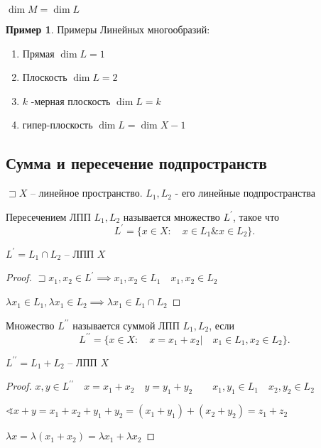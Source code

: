 \documentclass{book}
\newcommand{\p}[1]{#1^{\prime}}
\newcommand{\pp}[1]{#1^{\prime\prime}}
\theoremstyle{definition}
\newtheorem*{example}{Пример}
\begin{document}
\begin{definition}
    $\dim M = \dim L$
\end{definition}

\begin{example}
    Примеры Линейных многообразий:
    \begin{enumerate}
        \item Прямая $\dim L=1$
        \item Плоскость  $\dim L = 2$
        \item  $k$ -мерная плоскость  $\dim L=k$
        \item гипер-плоскость  $\dim L = \dim X-1$
    \end{enumerate}
\end{example}

\subsection{Сумма и пересечение подпространств}

$\sqsupset X$ -- линейное пространство. $L_1, L_2$ - его линейные подпространства

\begin{definition}
    Пересечением ЛПП $L_1, L_2$ называется множество $\p L$, такое что  \[
        \p L = \{x\in X:\quad x\in L_1 \& x\in L_2\}
    .\] 
\end{definition}

\begin{lemma}
    $\p L = L_1\cap L_2$ -- ЛПП $X$
\end{lemma}
\begin{proof}
    $\sqsupset x_1, x_2\in \p L \implies x_1, x_2\in L_1\quad x_1, x_2\in L_2$

    $\lambda x_1\in L_1, \lambda x_1\in L_2 \implies \lambda x_1\in L_1\cap L_2$
\end{proof}

\begin{definition}
    Множество $\pp L$ называется суммой  ЛПП $L_1, L_2$, если \[
        \pp L = \{x\in X:\quad x = x_1+x_2|\quad x_1\in L_1, x_2\in L_2\}
    .\] 
\end{definition}
\begin{lemma}
    $\pp L = L_1 + L_2$ -- ЛПП $X$
\end{lemma}
\begin{proof}
    $x, y\in \pp L\quad x = x_1+x_2\quad y = y_1+y_2\qquad x_1, y_1\in L_1\quad x_2, y_2\in L_2$

    $\sphericalangle x+y = x_1+x_2+y_1+y_2 = (x_1+y_1) + (x_2+y_2) = z_1+z_2$

    $\lambda x = \lambda (x_1+x_2) = \lambda x_1 + \lambda x_2$
\end{proof}
\end{document}
